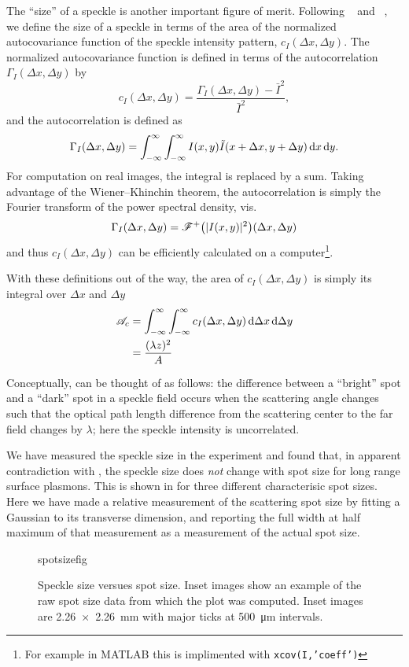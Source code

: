 The ``size'' of a speckle is another important figure of merit.
Following ~\cite{goodman1975statistical} and
~\cite{dainty1975laser}, we define the size of a
speckle in terms of the area of the normalized
autocovariance function of the speckle intensity pattern, $c_I(\Delta x,
\Delta y)$.  The normalized autocovariance function is defined in terms of
the autocorrelation $\Gamma_I(\Delta x, \Delta y)$ by 
\begin{equation}
c_I(\Delta x, \Delta y) = \frac{\Gamma_I(\Delta x, \Delta y) - \bar{I}^2}{\bar{I}^2},
\end{equation}
and the autocorrelation is defined as
\begin{equation}
\Gamma_I(\Delta x, \Delta y) = \int_{-\infty}^{\infty}\int_{-\infty}^{\infty} I(x,y) \tilde{I}(x+\Delta x,y+\Delta y) \,\mathrm{d} x \,\mathrm{d} y.
\end{equation}
For computation on real images, the integral is replaced by a sum.  Taking
advantage of the Wiener–Khinchin theorem, the autocorrelation is simply the
Fourier transform of the power spectral density, vis.
\begin{equation}
\Gamma_I(\Delta x, \Delta y) = {\mathscr{F}^{+}\bigl(|I(x,y)|^2\bigr)}(\Delta x, \Delta y)
\end{equation}
and thus  $c_I(\Delta x, \Delta y)$ can be efficiently calculated on a
computer\footnote{For example in MATLAB this is implimented with
\texttt{xcov(I,'coeff')}}.

With these definitions out of the way, the area of $c_I(\Delta x, \Delta
y)$ is simply its integral over $\Delta x$ and $\Delta y$
\begin{align}
\mathscr{A}_c &= \int_{-\infty}^{\infty}\int_{-\infty}^{\infty} c_I(\Delta x, \Delta y) \,\mathrm{d} \Delta x \,\mathrm{d} \Delta y\\
&=\frac{(\lambda z)^2}{A}
\label{eqn:spotsize}
\end{align}

Conceptually,  can be thought of as follows: the
difference between a ``bright'' spot and a ``dark'' spot in a speckle field
occurs when the scattering angle changes such that the optical path length
difference from the scattering center to the far field changes by
$\lambda$; here the speckle intensity is uncorrelated.

We have measured the speckle size in the experiment and found that, in
apparent contradiction with , the speckle size does
\textit{not} change with spot size for long range surface plasmons.  This
is shown in  for three different characterisic spot
sizes.  Here we have made a relative measurement of the scattering spot
size by fitting a Gaussian to its transverse dimension, and reporting the
full width at half maximum of that measurement as a measurement of the
actual spot size.
\begin{figure}[ht]
 \centering
 {spotsizefig}
 \caption{Speckle size versues spot size.  Inset images show an example of
 the raw spot size data from which the plot was computed.  Inset images are
 \SI{2.26x2.26}{\milli\meter} with major ticks at
 \SI{500}{\micro\meter} intervals.}
 \label{fig:spotsize}
\end{figure}


